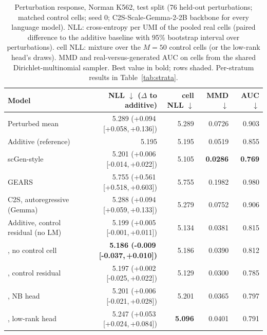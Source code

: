 \begin{table}[t]
\centering
\small
\setlength{\tabcolsep}{3.5pt}
\begin{tabular}{lrrrr}
\toprule
Model & NLL $\downarrow$ ($\Delta$ to additive) & cell NLL $\downarrow$ & MMD $\downarrow$ & AUC $\downarrow$ \\
\midrule
Perturbed mean & 5.289 (+0.094\,[+0.058,\,+0.136]) & 5.289 & 0.0726 & 0.903 \\
Additive (reference) & 5.195 & 5.195 & 0.0519 & 0.855 \\
scGen-style & 5.201 (+0.006\,[-0.014,\,+0.022]) & 5.105 & \textbf{0.0286} & \textbf{0.769} \\
GEARS & 5.755 (+0.561\,[+0.518,\,+0.603]) & 5.755 & 0.1982 & 0.980 \\
C2S, autoregressive (Gemma) & 5.288 (+0.094\,[+0.059,\,+0.133]) & 5.279 & 0.0752 & 0.906 \\
Additive, control residual (no LM) & 5.199 (+0.005\,[-0.001,\,+0.011]) & 5.134 & 0.0381 & 0.815 \\
\rowcolor{ours}\cad{}, no control cell & \textbf{5.186 (-0.009\,[-0.037,\,+0.010])} & 5.186 & 0.0390 & 0.812 \\
\rowcolor{ours}\cad{}, control residual & 5.197 (+0.002\,[-0.025,\,+0.022]) & 5.129 & 0.0300 & 0.785 \\
\rowcolor{ours}\cad{}, NB head & 5.201 (+0.006\,[-0.021,\,+0.028]) & 5.201 & 0.0365 & 0.797 \\
\rowcolor{ours}\cad{}, low-rank head & 5.247 (+0.053\,[+0.024,\,+0.084]) & \textbf{5.096} & 0.0401 & 0.791 \\
\bottomrule
\end{tabular}
\caption{Perturbation response, Norman K562, test split (76 held-out perturbations; matched control cells; seed 0; C2S-Scale-Gemma-2-2B backbone for every language model). NLL: cross-entropy per UMI of the pooled real cells (paired difference to the additive baseline with 95\% bootstrap interval over perturbations). cell NLL: mixture over the $M=50$ control cells (or the low-rank head's draws). MMD and real-versus-generated AUC on cells from the shared Dirichlet-multinomial sampler. Best value in bold; \cad{} rows shaded. Per-stratum results in Table~\ref{tab:strata}.}
\label{tab:norman_main}
\end{table}

